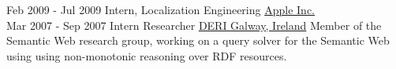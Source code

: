 \documentclass[letterpaper]{twentysecondcv} %
\begin{document}
\begin{twenty}
     \twentyitem
      {Feb 2009 -}
    {Jul 2009}
        {Intern, Localization Engineering}
        {\href{http://www.apple.com/}{Apple Inc.}}
        {}
        {
      }
     \\
     \twentyitem
        {Mar 2007 -}
        {Sep 2007}
        {Intern Researcher}
        {\href{http://www.deri.ie/}{DERI Galway, Ireland}}
        {Member of the Semantic Web research group, working on a query solver for the Semantic Web using using non-monotonic reasoning over RDF resources.}
        {
        }
        
\end{twenty}
\end{document}
